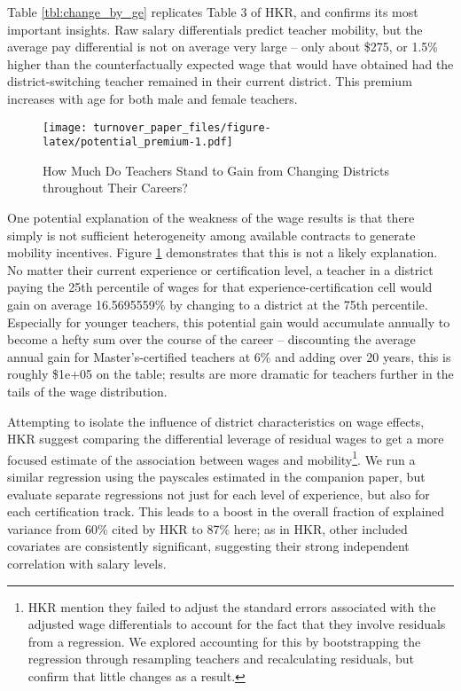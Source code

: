 \documentclass[12pt,]{article}
\let\rmarkdownfootnote\footnote%
\def\footnote{\protect\rmarkdownfootnote}
\begin{document}
Table \ref{tbl:change_by_ge} replicates Table 3 of HKR, and confirms its
most important insights. Raw salary differentials predict teacher
mobility, but the average pay differential is not on average very large
-- only about \$275, or 1.5\% higher than the counterfactually expected
wage that would have obtained had the district-switching teacher
remained in their current district. This premium increases with age for
both male and female teachers.

\begin{figure}[htbp]
\centering
\texttt{[image: turnover\_paper\_files/figure-latex/potential\_premium-1.pdf]}
\caption{\label{fig:premia}How Much Do Teachers Stand to Gain from
Changing Districts throughout Their Careers?}
\end{figure}

One potential explanation of the weakness of the wage results is that
there simply is not sufficient heterogeneity among available contracts
to generate mobility incentives. Figure \ref{fig:premia} demonstrates
that this is not a likely explanation. No matter their current
experience or certification level, a teacher in a district paying the
25th percentile of wages for that experience-certification cell would
gain on average 16.5695559\% by changing to a district at the 75th
percentile. Especially for younger teachers, this potential gain would
accumulate annually to become a hefty sum over the course of the career
-- discounting the average annual gain for Master's-certified teachers
at 6\% and adding over 20 years, this is roughly \$1e+05 on the table;
results are more dramatic for teachers further in the tails of the wage
distribution.

Attempting to isolate the influence of district characteristics on wage
effects, HKR suggest comparing the differential leverage of residual
wages to get a more focused estimate of the association between wages
and mobility\footnote{HKR mention they failed to adjust the standard
  errors associated with the adjusted wage differentials to account for
  the fact that they involve residuals from a regression. We explored
  accounting for this by bootstrapping the regression through resampling
  teachers and recalculating residuals, but confirm that little changes
  as a result.}. We run a similar regression using the payscales
estimated in the companion paper, but evaluate separate regressions not
just for each level of experience, but also for each certification
track. This leads to a boost in the overall fraction of explained
variance from 60\% cited by HKR to 87\% here; as in HKR, other included
covariates are consistently significant, suggesting their strong
independent correlation with salary levels.
\end{document}
